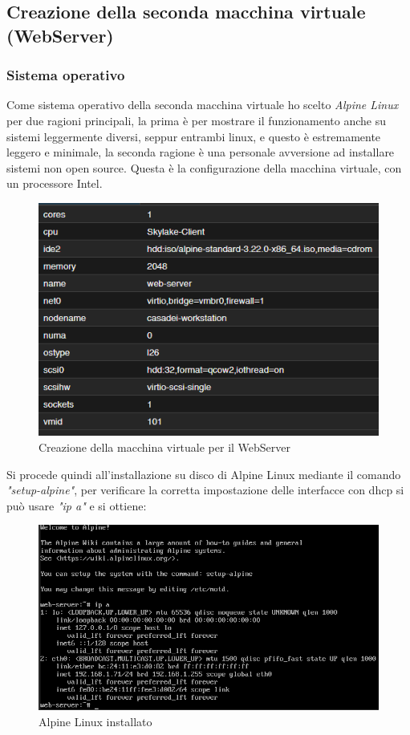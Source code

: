 \documentclass[a4paper]{article}
\begin{document}
\subsection{Creazione della seconda macchina virtuale (WebServer)}
\subsubsection{Sistema operativo}
Come sistema operativo della seconda macchina virtuale ho scelto \textit{Alpine Linux} per due ragioni principali, la prima
è per mostrare il funzionamento anche su sistemi leggermente diversi, seppur entrambi linux, e questo è estremamente leggero e minimale,
la seconda ragione è una personale avversione ad installare sistemi non open source. Questa è la configurazione della macchina virtuale,
con un processore Intel.

\begin{figure}[H]
    \centering
    \includegraphics[scale=0.9]{images/VMWebServer.png}
    \caption{Creazione della macchina virtuale per il WebServer}
\end{figure}

Si procede quindi all'installazione su disco di Alpine Linux mediante il comando \textit{"setup-alpine"},
per verificare la corretta impostazione delle interfacce con dhcp si può usare \textit{"ip a"} 
e si ottiene:
\begin{figure}[H]
    \centering
    \includegraphics[scale=0.6]{images/AlpineInstallato.png}
    \caption{Alpine Linux installato}
\end{figure}
\end{document}
